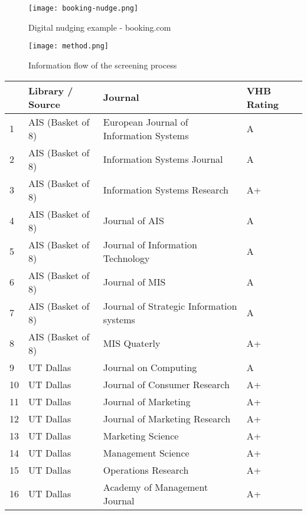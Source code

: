 
\begin{figure}[h]
    \centering
    \texttt{[image: booking-nudge.png]}
    \caption{Digital nudging example - booking.com}
    \label{fig:booking}
\end{figure}

\newpage


\begin{figure}[h]
    \centering
    \texttt{[image: method.png]}
    \caption{Information flow of the screening process}
    \label{fig:method}
\end{figure}

\newpage

\begin{table}[h!]
\small
\centering
\begin{tabular}{|l|l|p{9cm}|l|}
\hline
 & \textbf{Library / Source} & \textbf{Journal} & \textbf{VHB Rating} \\ \hline
1 & AIS (Basket of 8) & European Journal of Information Systems & A \\ \hline
2 & AIS (Basket of 8) & Information Systems Journal & A \\ \hline
3 & AIS (Basket of 8) & Information Systems Research & A+ \\ \hline
4 & AIS (Basket of 8) & Journal of AIS & A \\ \hline
5 & AIS (Basket of 8) & Journal of Information Technology & A \\ \hline
6 & AIS (Basket of 8) & Journal of MIS & A \\ \hline
7 & AIS (Basket of 8) & Journal of Strategic Information systems & A \\ \hline
8 & AIS (Basket of 8) & MIS Quaterly & A+ \\ \hline
9 & UT Dallas & Journal on Computing & A \\ \hline
10 & UT Dallas & Journal of Consumer Research & A+ \\ \hline
11 & UT Dallas & Journal of Marketing & A+ \\ \hline
12 & UT Dallas & Journal of Marketing Research & A+ \\ \hline
13 & UT Dallas & Marketing Science & A+ \\ \hline
14 & UT Dallas & Management Science & A+ \\ \hline
15 & UT Dallas & Operations Research & A+ \\ \hline
16 & UT Dallas & Academy of Management Journal & A+ \\ \hline

\end{tabular}
\end{table}

